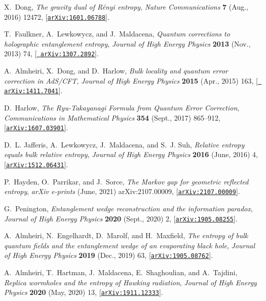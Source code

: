 \documentclass[a4paper,11pt]{article}
\begin{document}
\begin{thebibliography}{100}
X.~{Dong}, {\it {The gravity dual of R{\'e}nyi entropy}},  {\em Nature
  Communications} {\bf 7} (Aug., 2016) 12472,
  [\href{http://arxiv.org/abs/1601.06788}{{\tt arXiv:1601.06788}}].

T.~{Faulkner}, A.~{Lewkowycz}, and J.~{Maldacena}, {\it {Quantum corrections to
  holographic entanglement entropy}},  {\em Journal of High Energy Physics}
  {\bf 2013} (Nov., 2013) 74, [\href{http://arxiv.org/abs/1307.2892}{{\tt
  arXiv:1307.2892}}].

A.~{Almheiri}, X.~{Dong}, and D.~{Harlow}, {\it {Bulk locality and quantum
  error correction in AdS/CFT}},  {\em Journal of High Energy Physics} {\bf
  2015} (Apr., 2015) 163, [\href{http://arxiv.org/abs/1411.7041}{{\tt
  arXiv:1411.7041}}].

D.~{Harlow}, {\it {The Ryu-Takayanagi Formula from Quantum Error Correction}},
  {\em Communications in Mathematical Physics} {\bf 354} (Sept., 2017)
  865--912, [\href{http://arxiv.org/abs/1607.03901}{{\tt arXiv:1607.03901}}].

D.~L. {Jafferis}, A.~{Lewkowycz}, J.~{Maldacena}, and S.~J. {Suh}, {\it
  {Relative entropy equals bulk relative entropy}},  {\em Journal of High
  Energy Physics} {\bf 2016} (June, 2016) 4,
  [\href{http://arxiv.org/abs/1512.06431}{{\tt arXiv:1512.06431}}].

P.~{Hayden}, O.~{Parrikar}, and J.~{Sorce}, {\it {The Markov gap for geometric
  reflected entropy}},  {\em arXiv e-prints} (June, 2021) arXiv:2107.00009,
  [\href{http://arxiv.org/abs/2107.00009}{{\tt arXiv:2107.00009}}].

G.~{Penington}, {\it {Entanglement wedge reconstruction and the information
  paradox}},  {\em Journal of High Energy Physics} {\bf 2020} (Sept., 2020) 2,
  [\href{http://arxiv.org/abs/1905.08255}{{\tt arXiv:1905.08255}}].

A.~{Almheiri}, N.~{Engelhardt}, D.~{Marolf}, and H.~{Maxfield}, {\it {The
  entropy of bulk quantum fields and the entanglement wedge of an evaporating
  black hole}},  {\em Journal of High Energy Physics} {\bf 2019} (Dec., 2019)
  63, [\href{http://arxiv.org/abs/1905.08762}{{\tt arXiv:1905.08762}}].

A.~{Almheiri}, T.~{Hartman}, J.~{Maldacena}, E.~{Shaghoulian}, and
  A.~{Tajdini}, {\it {Replica wormholes and the entropy of Hawking radiation}},
   {\em Journal of High Energy Physics} {\bf 2020} (May, 2020) 13,
  [\href{http://arxiv.org/abs/1911.12333}{{\tt arXiv:1911.12333}}].


\end{thebibliography}
\end{document}
